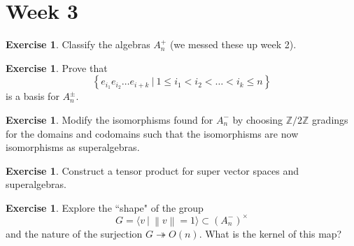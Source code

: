 \documentclass[psamsfonts]{amsart}
\theoremstyle{definition}
\newtheorem{exer}[thm]{Exercise}
\theoremstyle{remark}
\newcommand{\Z}{\mathbb{Z}}
\newcommand{\set}[1]{\left\lbrace #1 \right\rbrace}
\newcommand{\norm}[1]{\left\lVert#1\right\rVert}
\begin{document}
\section*{Week 3}
\begin{exer}
Classify the algebras $A^+_n$ (we messed these up week 2).
\end{exer}
%
\begin{exer}
Prove that 
$$\set{e_{i_1}e_{i_2}\ldots e_{i+k} ~|~ 1 \leq i_1 < i_2 < \ldots < i_k \leq n} $$
is a basis for $A^\pm_n$.
\end{exer}
%
\begin{exer}
Modify the isomorphisms found for $A^-_n$ by choosing $\Z/2\Z$ gradings for the domains and codomains such that the isomorphisms are now isomorphisms as superalgebras.
\end{exer}
%
\begin{exer}
Construct a tensor product for super vector spaces and superalgebras.
\end{exer}
%
\begin{exer}
Explore the ``shape" of the group 
$$G = \langle v ~|~ \norm{v} = 1 \rangle \subset (A_n^-)^\times $$
and the nature of the surjection $G \twoheadrightarrow O(n)$. What is the kernel of this map?
\end{exer}
%
\setcounter{section}{4}
%
\setcounter{thm}{0}
%
\end{document}
